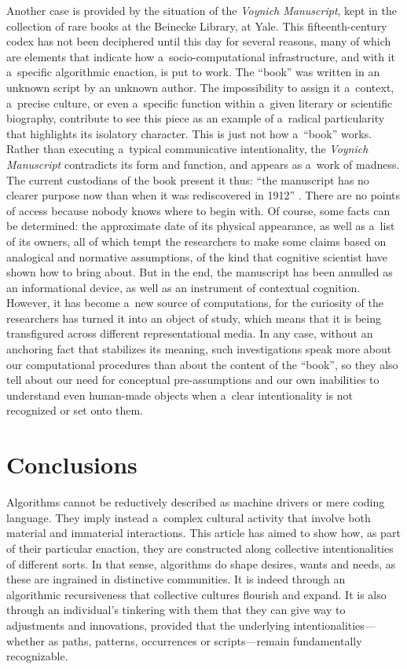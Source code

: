 Another case is provided by the situation of the \textit{Voynich Manuscript}, kept in the collection of rare books at the Beinecke Library, at Yale. This fifteenth-century codex has not been deciphered until this day for several reasons, many of which are elements that indicate how a~socio-computational infrastructure, and with it a~specific algorithmic enaction, is put to work. The ``book'' was written in an unknown script by an unknown author. The impossibility to assign it a~context, a~precise culture, or even a~specific function within a~given literary or scientific biography, contribute to see this piece as an example of a~radical particularity that highlights its isolatory character. This is just not how a~``book'' works. Rather than executing a~typical communicative intentionality, the \textit{Voynich Manuscript} contradicts its form and function, and appears as a~work of madness. The current custodians of the book present it thus: ``the manuscript has no clearer purpose now than when it was rediscovered in 1912''
\parencite[][]{clemens_voynich_2016}. %
 There are no points of access because nobody knows where to begin with. Of course, some facts can be determined: the approximate date of its physical appearance, as well as a~list of its owners, all of which tempt the researchers to make some claims based on analogical and normative assumptions, of the kind that cognitive scientist have shown how to bring about. But in the end, the manuscript has been annulled as an informational device, as well as an instrument of contextual cognition. However, it has become a~new source of computations, for the curiosity of the researchers has turned it into an object of study, which means that it is being transfigured across different representational media. In any case, without an anchoring fact that stabilizes its meaning, such investigations speak more about our computational procedures than about the content of the ``book'', so they also tell about our need for conceptual pre-assumptions and our own inabilities to understand even human-made objects when a~clear intentionality is not recognized or set onto them.

\section*{Conclusions}
Algorithms cannot be reductively described as machine drivers or mere coding language. They imply instead a~complex cultural activity that involve both material and immaterial interactions. This article has aimed to show how, as part of their particular enaction, they are constructed along collective intentionalities of different sorts. In that sense, algorithms do shape desires, wants and needs, as these are ingrained in distinctive communities. It is indeed through an algorithmic recursiveness that collective cultures flourish and expand. It is also through an individual's tinkering with them that they can give way to adjustments and innovations, provided that the underlying intentionalities—whether as paths, patterns, occurrences or scripts—remain fundamentally recognizable.

